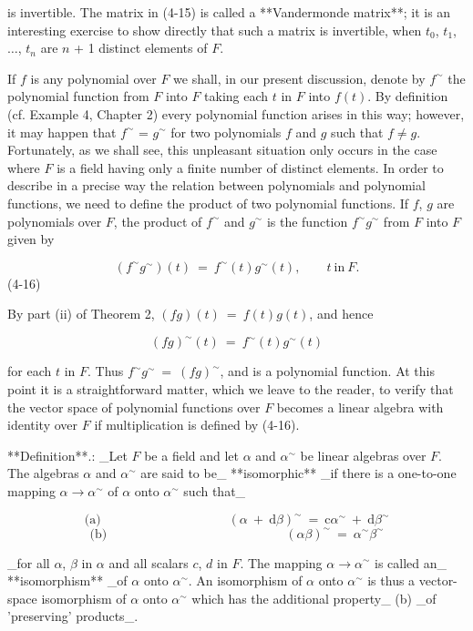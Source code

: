 is invertible. The matrix in (4-15) is called a **Vandermonde matrix**; it is an interesting exercise to show directly that such a matrix is invertible, when \(t_{0}\), \(t_{1}\), \(\ldots\), \(t_{n}\) are \(n\) + 1 distinct elements of \(F\).

If \(f\) is any polynomial over \(F\) we shall, in our present discussion, denote by \(f^{\sim}\) the polynomial function from \(F\) into \(F\) taking each \(t\) in \(F\) into \(f(t)\). By definition (cf. Example 4, Chapter 2) every polynomial function arises in this way; however, it may happen that \(f^{\sim}\) = \(g^{\sim}\) for two polynomials \(f\) and \(g\) such that \(f\neq g\). Fortunately, as we shall see, this unpleasant situation only occurs in the case where \(F\) is a field having only a finite number of distinct elements. In order to describe in a precise way the relation between polynomials and polynomial functions, we need to define the product of two polynomial functions. If \(f\), \(g\) are polynomials over \(F\), the product of \(f^{\sim}\) and \(g^{\sim}\) is the function \(f^{\sim}g^{\sim}\) from \(F\) into \(F\) given by

\[(f^{\sim}g^{\sim})(t)\ =\ f^{\sim}(t)g^{\sim}(t),\qquad t\ \mbox{in}\ F.\] (4-16)

By part (ii) of Theorem 2, \((fg)(t)\ =\ f(t)g(t)\), and hence

\[(fg)^{\sim}(t)\ =\ f^{\sim}(t)g^{\sim}(t)\]

for each \(t\) in \(F\). Thus \(f^{\sim}g^{\sim}\ =\ (fg)^{\sim}\), and is a polynomial function. At this point it is a straightforward matter, which we leave to the reader, to verify that the vector space of polynomial functions over \(F\) becomes a linear algebra with identity over \(F\) if multiplication is defined by (4-16).

**Definition**.: _Let \(F\) be a field and let \(\alpha\) and \(\alpha^{\sim}\) be linear algebras over \(F\). The algebras \(\alpha\) and \(\alpha^{\sim}\) are said to be_ **isomorphic** _if there is a one-to-one mapping \(\alpha\to\alpha^{\sim}\) of \(\alpha\) onto \(\alpha^{\sim}\) such that_

\[\mbox{(a)}\qquad\qquad\qquad\qquad\qquad(\alpha\ +\ \mbox{d}\beta)^{ \sim}\ =\ \mbox{c}\alpha^{\sim}\ +\ \mbox{d}\beta^{\sim}\] \[\mbox{(b)}\qquad\qquad\qquad\qquad\qquad\qquad\qquad(\alpha\beta )^{\sim}\ =\ \alpha^{\sim}\beta^{\sim}\]

_for all \(\alpha\), \(\beta\) in \(\alpha\) and all scalars \(c\), \(d\) in \(F\). The mapping \(\alpha\to\alpha^{\sim}\) is called an_ **isomorphism** _of \(\alpha\) onto \(\alpha^{\sim}\). An isomorphism of \(\alpha\) onto \(\alpha^{\sim}\) is thus a vector-space isomorphism of \(\alpha\) onto \(\alpha^{\sim}\) which has the additional property_ (b) _of 'preserving' products_.


